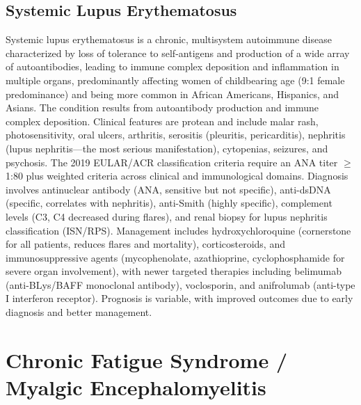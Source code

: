 \subsection{Systemic Lupus Erythematosus}
\label{sec:Systemic Lupus Erythematosus}
Systemic lupus erythematosus is a chronic, multisystem autoimmune disease characterized by loss of tolerance to self-antigens and production of a wide array of autoantibodies, leading to immune complex deposition and inflammation in multiple organs, predominantly affecting women of childbearing age (9:1 female predominance) and being more common in African Americans, Hispanics, and Asians. The condition results from autoantibody production and immune complex deposition. Clinical features are protean and include malar rash, photosensitivity, oral ulcers, arthritis, serositis (pleuritis, pericarditis), nephritis (lupus nephritis---the most serious manifestation), cytopenias, seizures, and psychosis. The 2019 EULAR/ACR classification criteria require an ANA titer $\geq$1:80 plus weighted criteria across clinical and immunological domains. Diagnosis involves antinuclear antibody (ANA, sensitive but not specific), anti-dsDNA (specific, correlates with nephritis), anti-Smith (highly specific), complement levels (C3, C4 decreased during flares), and renal biopsy for lupus nephritis classification (ISN/RPS). Management includes hydroxychloroquine (cornerstone for all patients, reduces flares and mortality), corticosteroids, and immunosuppressive agents (mycophenolate, azathioprine, cyclophosphamide for severe organ involvement), with newer targeted therapies including belimumab (anti-BLys/BAFF monoclonal antibody), voclosporin, and anifrolumab (anti-type I interferon receptor). Prognosis is variable, with improved outcomes due to early diagnosis and better management.

\section{Chronic Fatigue Syndrome / Myalgic Encephalomyelitis}




